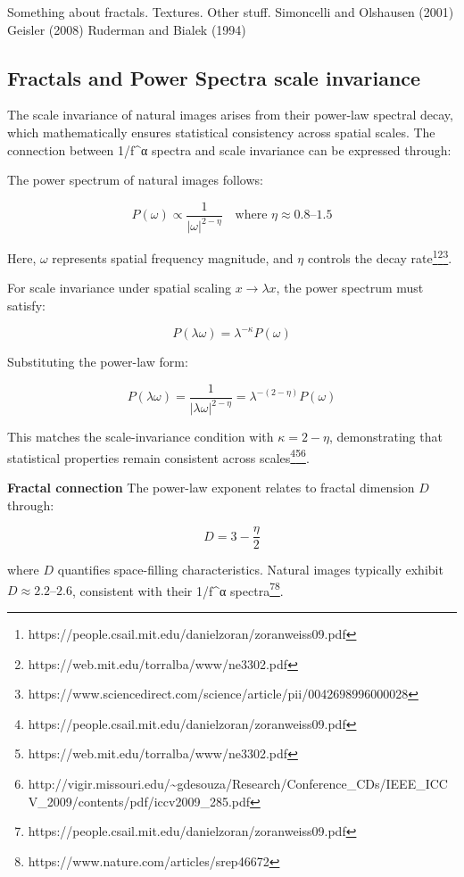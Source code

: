 \documentclass[
  letterpaper,
]{book}
\begin{document}
Something about fractals. Textures. Other stuff. Simoncelli and
Olshausen (2001) Geisler (2008) Ruderman and Bialek (1994)

\subsection{Fractals and Power Spectra scale
invariance}\label{sec-fractals}

The scale invariance of natural images arises from their power-law
spectral decay, which mathematically ensures statistical consistency
across spatial scales. The connection between 1/f\^{}α spectra and scale
invariance can be expressed through:

The power spectrum of natural images follows:

\[
P(\omega) \propto \frac{1}{|\omega|^{2-\eta}} \quad \text{where } \eta \approx 0.8\text{--}1.5
\]

Here, \(\omega\) represents spatial frequency magnitude, and \(\eta\)
controls the decay rate\footnote{https://people.csail.mit.edu/danielzoran/zoranweiss09.pdf}\footnote{https://web.mit.edu/torralba/www/ne3302.pdf}\footnote{https://www.sciencedirect.com/science/article/pii/0042698996000028}.

For scale invariance under spatial scaling \(x \to \lambda x\), the
power spectrum must satisfy:

\[
P(\lambda\omega) = \lambda^{-\kappa}P(\omega)
\]

Substituting the power-law form:

\[
P(\lambda\omega) = \frac{1}{|\lambda\omega|^{2-\eta}} = \lambda^{-(2-\eta)}P(\omega)
\]

This matches the scale-invariance condition with \(\kappa = 2-\eta\),
demonstrating that statistical properties remain consistent across
scales\footnote{https://people.csail.mit.edu/danielzoran/zoranweiss09.pdf}\footnote{https://web.mit.edu/torralba/www/ne3302.pdf}\footnote{http://vigir.missouri.edu/\textasciitilde gdesouza/Research/Conference\_CDs/IEEE\_ICCV\_2009/contents/pdf/iccv2009\_285.pdf}.

\textbf{Fractal connection} The power-law exponent relates to fractal
dimension \(D\) through:

\[
D = 3 - \frac{\eta}{2}
\]

where \(D\) quantifies space-filling characteristics. Natural images
typically exhibit \(D \approx 2.2\text{--}2.6\), consistent with their
1/f\^{}α spectra\footnote{https://people.csail.mit.edu/danielzoran/zoranweiss09.pdf}\footnote{https://www.nature.com/articles/srep46672}.
\end{document}
